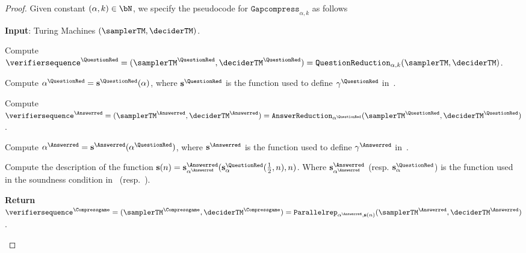 \begin{proof}
	Given constant $(\alpha, k) \in \bN$, we specify the pseudocode for $\texttt{Gapcompress}_{\alpha, k}$ as follows
	
	\vspace{10pt}
	\IncMargin{1em}
	\begin{algorithm}[H]
		\DontPrintSemicolon
		
		\textbf{Input}: Turing Machines $(\samplerTM, \deciderTM)$. 
		
		Compute $\verifiersequence^{\QuestionRed} = (\samplerTM^{\QuestionRed}, \deciderTM^{\QuestionRed}) = \texttt{QuestionReduction}_{\alpha, k}(\samplerTM, \deciderTM)$.
		
		Compute $\alpha^{\QuestionRed} = \mathbf{s}^{\QuestionRed}(\alpha)$, where $ \mathbf{s}^{\QuestionRed}$ is the function used to define $\gamma^{\QuestionRed}$ in~. 
		
		Compute $\verifiersequence^{\Answerred} =  (\samplerTM^{\Answerred}, \deciderTM^{\Answerred}) = \texttt{AnswerReduction}_{\alpha^{\QuestionRed}}(\samplerTM^{\QuestionRed}, \deciderTM^{\QuestionRed})$.
		
		Compute $\alpha^{\Answerred} = \mathbf{s}^{\Answerred} (\alpha^{\QuestionRed})$, where $ \mathbf{s}^{\Answerred}$ is the function used to define $\gamma^{\Answerred}$ in~. 
		
		Compute the description of the function $\mathbf{s}(n) = \mathbf{s}_{\alpha^{\Answerred} }^{\Answerred} ( \mathbf{s}_{\alpha}^{\QuestionRed}( \frac{1}{2},n), n)$. Where $\mathbf{s}_{\alpha^{\Answerred} }^{\Answerred}$ (resp. $\mathbf{s}_{\alpha}^{\QuestionRed}$) is the function used in the soundness condition in~ (resp.~).
		
		\textbf{Return} $\verifiersequence^{\Compressgame} =  (\samplerTM^{\Compressgame}, \deciderTM^{\Compressgame}) =  \texttt{Parallelrep}_{\alpha^{\Answerred}, \mathbf{s}(n)} (\samplerTM^{\Answerred}, \deciderTM^{\Answerred})$.
		
		\caption{The description for $\texttt{Gapcompress}_{\alpha, k}$.}
		\label{pseu:Gapcompress}
	\end{algorithm}\DecMargin{1em}
	\vspace{10pt} 
	

\end{proof}
